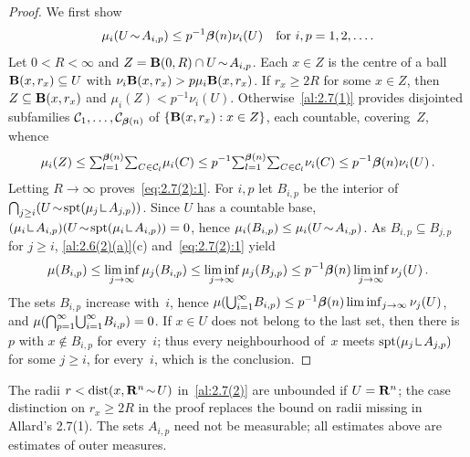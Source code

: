 \begin{proof}
    We first show
    \begin{equation}
        \label{eq:2.7(2):1}
        \mu_i(U \!\sim\! A_{i,p}) \le p^{-1} \boldsymbol{\beta}(n) \nu_i(U) \quad \text{for $i, p = 1,
        2, \ldots$} \,.
    \end{equation}
    Let $0 < R < \infty$ and $Z = \mathbf{B}(0,R) \cap U \!\sim\! A_{i,p}$. Each $x \in Z$ is the
    centre of a ball $\mathbf{B}(x,r_x) \subseteq U$ with $\nu_i \mathbf{B}(x,r_x) > p \mu_i
    \mathbf{B}(x,r_x)$. If $r_x \ge 2R$ for some $x \in Z$, then $Z \subseteq \mathbf{B}(x,r_x)$ and
    $\mu_i(Z) < p^{-1} \nu_i(U)$. Otherwise~\ref{al:2.7(1)} provides disjointed subfamilies
    $\mathcal{C}_1, \ldots, \mathcal{C}_{\boldsymbol{\beta}(n)}$ of $\{ \mathbf{B}(x,r_x) : x \in Z \}$,
    each countable, covering~$Z$, whence
    \begin{displaymath}
        \mu_i(Z) \le {\textstyle\sum_{l=1}^{\boldsymbol{\beta}(n)}} {\textstyle\sum_{C \in \mathcal{C}_l}^{}} \mu_i(C)
        \le p^{-1} {\textstyle\sum_{l=1}^{\boldsymbol{\beta}(n)}} {\textstyle\sum_{C \in \mathcal{C}_l}^{}} \nu_i(C) \le
        p^{-1} \boldsymbol{\beta}(n) \nu_i(U) \,.
    \end{displaymath}
    Letting $R \to \infty$ proves~\eqref{eq:2.7(2):1}. For $i, p$ let $B_{i,p}$ be the interior
    of $\tbcap_{j \ge i} (U \without \spt(\mu_j \restrict A_{j,p}))$. Since $U$ has a countable
    base, $(\mu_i \restrict A_{i,p})(U \without \spt(\mu_i \restrict A_{i,p})) = 0$, hence
    $\mu_i(B_{i,p}) \le \mu_i(U \!\sim\! A_{i,p})$. As $B_{i,p} \subseteq B_{j,p}$ for $j \ge i$,
    \ref{al:2.6(2)(a)}(c) and~\eqref{eq:2.7(2):1} yield
    \begin{displaymath}
        \mu(B_{i,p}) \le \liminf_{j \to \infty} \mu_j(B_{i,p}) \le \liminf_{j \to \infty}
        \mu_j(B_{j,p}) \le p^{-1} \boldsymbol{\beta}(n) \liminf_{j \to \infty} \nu_j(U) \,.
    \end{displaymath}
    The sets $B_{i,p}$ increase with~$i$, hence $\mu({{\textstyle \bigcup}}_{i=1}^\infty B_{i,p}) \le p^{-1}
    \boldsymbol{\beta}(n) \liminf_{j \to \infty} \nu_j(U)$, and $\mu({{\textstyle \bigcap}}_{p=1}^\infty
    {{\textstyle \bigcup}}_{i=1}^\infty B_{i,p}) = 0$. If $x \in U$ does not belong to the last set, then there
    is~$p$ with $x \notin B_{i,p}$ for every~$i$; thus every neighbourhood of~$x$ meets
    $\spt(\mu_j \restrict A_{j,p})$ for some $j \ge i$, for every~$i$, which is the conclusion.
\end{proof}

\begin{remark}
    \label{rem:2.7(2)}
    The radii $r < \operatorname{dist}(x, \mathbf{R}^{n} \!\sim\! U)$ in~\ref{al:2.7(2)} are unbounded if $U =
    \mathbf{R}^{n}$; the case distinction on $r_x \ge 2R$ in the proof replaces the bound on radii
    missing in Allard's 2.7(1). The sets $A_{i,p}$ need not be measurable; all estimates above
    are estimates of outer measures.
\end{remark}


